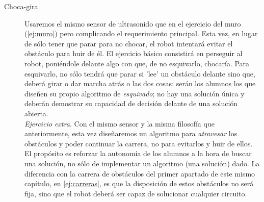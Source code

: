 \begin{description}
\item[Choca-gira]\label{ej:chocaGira}
Usaremos el mismo sensor de ultrasonido que en el ejercicio del muro (\ref{ej:muro}) pero complicando el requerimiento principal. Esta vez, en lugar de sólo tener que parar para no chocar, el robot intentará evitar el obstáculo para huir de él. El ejercicio básico consistirá en perseguir al robot, poniéndole delante algo con que, de no esquivarlo, chocaría. Para esquivarlo, no sólo tendrá que parar si 'lee' un obstáculo delante sino que, deberá girar o dar marcha atrás o las dos cosas: serán los alumnos los que diseñen su propio algoritmo de \textit{esquivado}; no hay una solución única y deberán demostrar su capacidad de decisión delante de una solución abierta. \\
\textit{Ejercicio extra}. Con el mismo sensor y la misma filosofía que anteriormente, esta vez diseñaremos un algoritmo para \textit{atravesar} los obstáculos y poder continuar la carrera, no para evitarlos y huir de ellos. \\
El propósito es reforzar la autonomía de los alumnos a la hora de buscar una solución, no sólo de implementar un algoritmo (una solución) dado. La diferencia con la carrera de obstáculos del primer apartado de este mismo capítulo, en \ref{ej:carreras}, es que la disposición de estos obstáculos no será fija, sino que el robot deberá ser capaz de solucionar cualquier circuito.
\end{description}

